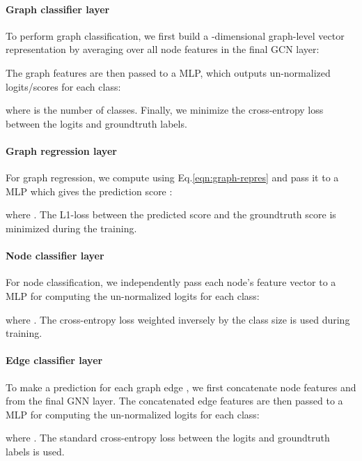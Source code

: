 \documentclass{article}
\begin{document}
\paragraph{Graph classifier layer}
To perform graph classification, we first build a -dimensional graph-level vector representation  by averaging over all node features in the final GCN layer:

The graph features are then passed to a MLP, which outputs un-normalized logits/scores  for each class:

where  is the number of classes. 
Finally, we minimize the cross-entropy loss between the logits and groundtruth labels.



\paragraph{Graph regression layer}
For graph regression, we compute  using Eq.\eqref{eqn:graph-repres} and pass it to a MLP which gives the prediction score :

where .
The L1-loss between the predicted score and the groundtruth score is minimized during the training.



\paragraph{Node classifier layer}
For node classification, we independently pass each node's feature vector to a MLP for computing the un-normalized logits  for each class:

where . The cross-entropy loss weighted inversely by the class size is used during training.







\paragraph{Edge classifier layer}
To make a prediction for each graph edge , we first concatenate node features  and  from the final GNN layer. 
The concatenated edge features are then passed to a MLP for computing the un-normalized logits  for each class:

where . The standard cross-entropy loss between the logits and groundtruth labels is used.
\end{document}
